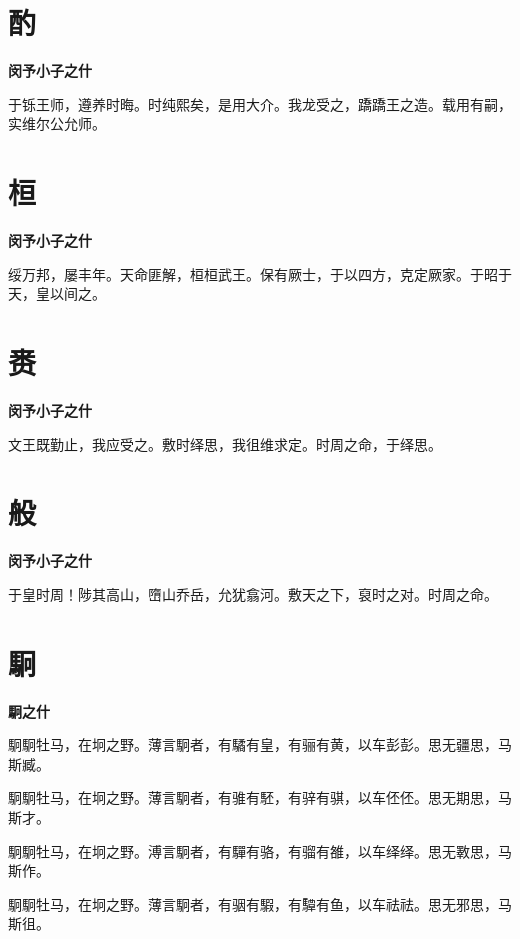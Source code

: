 \documentclass[12pt,a4paper]{ctexbook}
\begin{document}
\section{酌}
\textbf{闵予小子之什}\par\vspace{0.5em}
于铄王师，遵养时晦。时纯熙矣，是用大介。我龙受之，蹻蹻王之造。载用有嗣，实维尔公允师。\par

\section{桓}
\textbf{闵予小子之什}\par\vspace{0.5em}
绥万邦，屡丰年。天命匪解，桓桓武王。保有厥士，于以四方，克定厥家。于昭于天，皇以间之。\par

\section{赉}
\textbf{闵予小子之什}\par\vspace{0.5em}
文王既勤止，我应受之。敷时绎思，我徂维求定。时周之命，于绎思。\par

\section{般}
\textbf{闵予小子之什}\par\vspace{0.5em}
于皇时周！陟其高山，嶞山乔岳，允犹翕河。敷天之下，裒时之对。时周之命。\par

\section{駉}
\textbf{駉之什}\par\vspace{0.5em}
駉駉牡马，在坰之野。薄言駉者，有驈有皇，有骊有黄，以车彭彭。思无疆思，马斯臧。\par
駉駉牡马，在坰之野。薄言駉者，有骓有駓，有骍有骐，以车伾伾。思无期思，马斯才。\par
駉駉牡马，在坰之野。溥言駉者，有驒有骆，有骝有雒，以车绎绎。思无斁思，马斯作。\par
駉駉牡马，在坰之野。薄言駉者，有骃有騢，有驔有鱼，以车祛祛。思无邪思，马斯徂。\par
\end{document}
